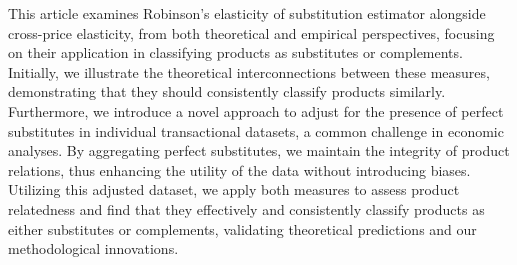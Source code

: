 
\begin{Abstrakt}
    This article examines Robinson's elasticity of substitution estimator alongside cross-price elasticity, from both theoretical and empirical perspectives, focusing on their application in classifying products as substitutes or complements. Initially, we illustrate the theoretical interconnections between these measures, demonstrating that they should consistently classify products similarly. Furthermore, we introduce a novel approach to adjust for the presence of perfect substitutes in individual transactional datasets, a common challenge in economic analyses. By aggregating perfect substitutes, we maintain the integrity of product relations, thus enhancing the utility of the data without introducing biases. Utilizing this adjusted dataset, we apply both measures to assess product relatedness and find that they effectively and consistently classify products as either substitutes or complements, validating theoretical predictions and our methodological innovations.
\end{Abstrakt}



\clearpage